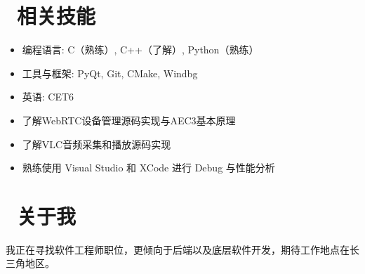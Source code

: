 \documentclass{resume}
\begin{document}

\section{\faCogs\ 相关技能}
\begin{itemize}
    \item 编程语言: C（熟练）, C++（了解）, Python（熟练）
    \item 工具与框架: PyQt, Git, CMake, Windbg
    \item 英语: CET6
    \item 了解WebRTC设备管理源码实现与AEC3基本原理
    \item 了解VLC音频采集和播放源码实现
    \item 熟练使用 Visual Studio 和 XCode 进行 Debug 与性能分析
\end{itemize}


\section{\faGamepad\ 关于我}
我正在寻找软件工程师职位，更倾向于后端以及底层软件开发，期待工作地点在长三角地区。

%
%
\end{document}
